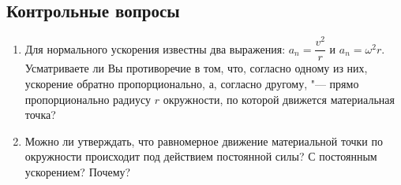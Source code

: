 \documentclass[a4paper, 12pt]{extarticle}
\begin{document}
\subsection{Контрольные вопросы}
\begin{enumerate}
\item Для нормального ускорения известны два выражения: $a_n = \dfrac{v^2}{r}$ и $a_n = \omega^2 r$. Усматриваете ли Вы противоречие в том, что, согласно одному из них, ускорение обратно пропорционально, а, согласно другому, "--- прямо пропорционально радиусу $r$ окружности, по которой движется материальная точка? %
\item Можно ли утверждать, что равномерное движение материальной точки по окружности происходит под действием постоянной силы? С постоянным ускорением? Почему?
\end{enumerate}
\end{document}
